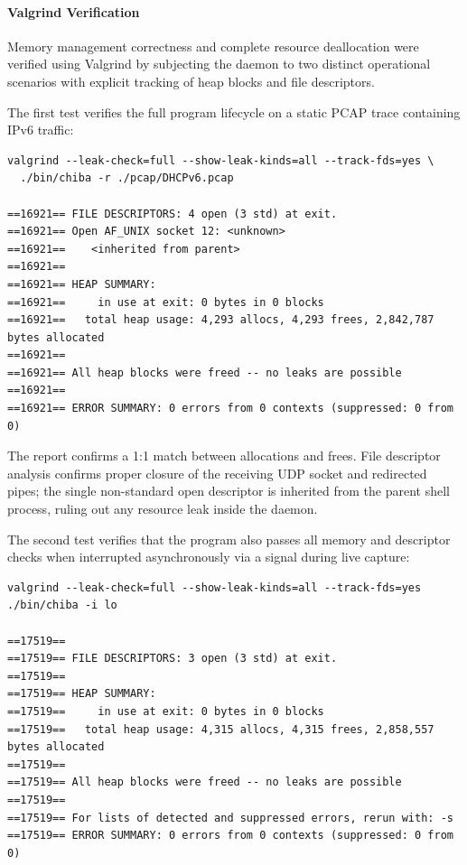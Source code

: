 \documentclass[11pt,a4paper]{article}
\newenvironment{codebox}[1][]{%
    \begin{tcolorbox}[
        colback=codebg,
        colframe=codeframe,
        boxrule=0.6pt,
        arc=1.5mm,
        left=3mm,
        right=3mm,
        top=2mm,
        bottom=2mm,
        fonttitle=\sffamily\bfseries\footnotesize,
        coltitle=chibadark,
        colbacktitle=codeframe!50!white,
        #1
    ]
}{%
    \end{tcolorbox}
}
\begin{document}
\paragraph{Valgrind Verification}
Memory management correctness and complete resource deallocation were verified using Valgrind by subjecting the daemon to two distinct operational scenarios with explicit tracking of heap blocks and file descriptors.

The first test verifies the full program lifecycle on a static PCAP trace containing IPv6 traffic:
\begin{codebox}[title={Valgrind Verification --- Offline PCAP Mode}]
\footnotesize
\begin{verbatim}
valgrind --leak-check=full --show-leak-kinds=all --track-fds=yes \
  ./bin/chiba -r ./pcap/DHCPv6.pcap

==16921== FILE DESCRIPTORS: 4 open (3 std) at exit.
==16921== Open AF_UNIX socket 12: <unknown>
==16921==    <inherited from parent>
==16921== 
==16921== HEAP SUMMARY:
==16921==     in use at exit: 0 bytes in 0 blocks
==16921==   total heap usage: 4,293 allocs, 4,293 frees, 2,842,787 bytes allocated
==16921== 
==16921== All heap blocks were freed -- no leaks are possible
==16921== 
==16921== ERROR SUMMARY: 0 errors from 0 contexts (suppressed: 0 from 0)
\end{verbatim}
\end{codebox}
The report confirms a 1:1 match between allocations and frees. File descriptor analysis confirms proper closure of the receiving UDP socket and redirected pipes; the single non-standard open descriptor is inherited from the parent shell process, ruling out any resource leak inside the daemon.

The second test verifies that the program also passes all memory and descriptor checks when interrupted asynchronously via a signal during live capture:
\begin{codebox}[title={Valgrind Verification --- Live Capture Mode with Asynchronous Interrupt}]
\footnotesize
\begin{verbatim}
valgrind --leak-check=full --show-leak-kinds=all --track-fds=yes ./bin/chiba -i lo

==17519==
==17519== FILE DESCRIPTORS: 3 open (3 std) at exit.
==17519==
==17519== HEAP SUMMARY:
==17519==     in use at exit: 0 bytes in 0 blocks
==17519==   total heap usage: 4,315 allocs, 4,315 frees, 2,858,557 bytes allocated
==17519==
==17519== All heap blocks were freed -- no leaks are possible
==17519==
==17519== For lists of detected and suppressed errors, rerun with: -s
==17519== ERROR SUMMARY: 0 errors from 0 contexts (suppressed: 0 from 0)
\end{verbatim}
\end{codebox}
\end{document}

